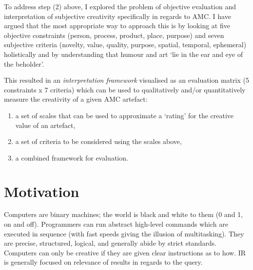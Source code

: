 
To address step (2) above, I explored the problem of objective evaluation and interpretation of subjective creativity specifically in regards to \ac{AMC}. I have argued that the most appropriate way to approach this is by looking at five objective constraints (person, process, product, place, purpose) and seven subjective criteria (novelty, value, quality, purpose, spatial, temporal, ephemeral) holistically and by understanding that humour and art `lie in the ear and eye of the beholder'.

This resulted in an \emph{interpretation framework} visualised as an evaluation matrix (\num{5} constraints x \num{7} criteria) which can be used to qualitatively and/or quantitatively measure the creativity of a given \ac{AMC} artefact:

\begin{enumerate}
  \item a set of scales that can be used to approximate a `rating' for the creative value of an artefact,
  \item a set of criteria to be considered using the scales above,
  \item a combined framework for evaluation.
\end{enumerate}


\section{Motivation}

Computers are binary machines; the world is black and white to them (0 and 1, on and off). Programmers can run abstract high-level commands which are executed in sequence (with fast speeds giving the illusion of multitasking). They are precise, structured, logical, and generally abide by strict standards. Computers can only be creative if they are given clear instructions as to how. \acl{IR} is generally focused on relevance of results in regards to the query.

